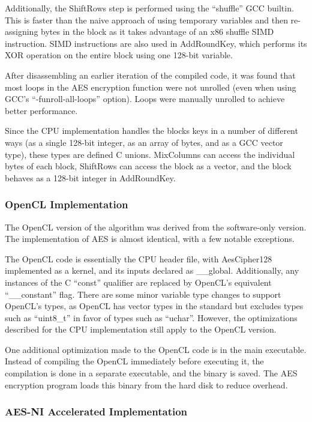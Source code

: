 \documentclass[a4paper,10pt,conference]{IEEEtran}
\begin{document}
Additionally, the ShiftRows step is performed using the ``shuffle'' GCC builtin.  This is faster than the naive approach of using temporary variables and then re-assigning bytes in the block as it takes advantage of an x86 shuffle SIMD instruction.  SIMD instructions are also used in AddRoundKey, which performs its XOR operation on the entire block using one 128-bit variable.

After disassembling an earlier iteration of the compiled code, it was found that most loops in the AES encryption function were not unrolled (even when using GCC's ``-funroll-all-loops'' option).  Loops were manually unrolled to achieve better performance.

Since the CPU implementation handles the blocks keys in a number of different ways (as a single 128-bit integer, as an array of bytes, and as a GCC vector type), these types are defined C unions. MixColumns can access the individual bytes of each block, ShiftRows can access the block as a vector, and the block behaves as a 128-bit integer in AddRoundKey.

\subsubsection{OpenCL Implementation}

The OpenCL version of the algorithm was derived from the software-only version.  The implementation of AES is almost identical, with a few notable exceptions.

The OpenCL code is essentially the CPU header file, with AesCipher128 implemented as a kernel, and its inputs declared as \_\_global.  Additionally, any instances of the C ``const'' qualifier are replaced by OpenCL's equivalent ``\_\_constant'' flag.  There are some minor variable type changes to support OpenCL's types, as OpenCL has vector types in the standard but excludes types such as ``uint8\_t'' in favor of types such as ``uchar''.  However, the optimizations described for the CPU implementation still apply to the OpenCL version.

One additional optimization made to the OpenCL code is in the main executable.  Instead of compiling the OpenCL immediately before executing it, the compilation is done in a separate executable, and the binary is saved.  The AES encryption program loads this binary from the hard disk to reduce overhead.

\subsubsection{AES-NI Accelerated Implementation}
\end{document}
